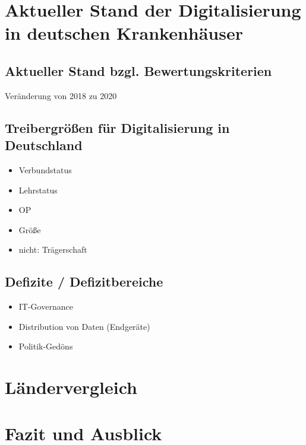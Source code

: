\section{Aktueller Stand der Digitalisierung in deutschen Krankenhäuser}
	\subsection{Aktueller Stand bzgl. Bewertungskriterien}
		Veränderung von 2018 zu 2020
	\subsection{Treibergrößen für Digitalisierung in Deutschland}
	\begin{itemize}
		\item Verbundstatus \parencite{cresswell2013}
		\item Lehrstatus
		\item OP
		\item Größe \parencite{cresswell2013}
		\item nicht: Trägerschaft \parencite{cresswell2013}
	\end{itemize}
	\subsection{Defizite / Defizitbereiche}
	\begin{itemize}
		\item IT-Governance
		\item Distribution von Daten (Endgeräte)
		\item Politik-Gedöns
	\end{itemize}
\section{Ländervergleich}

\section{Fazit und Ausblick}
\newpage
{}
\setcounter{page}{3}
\printbibliography
{}

